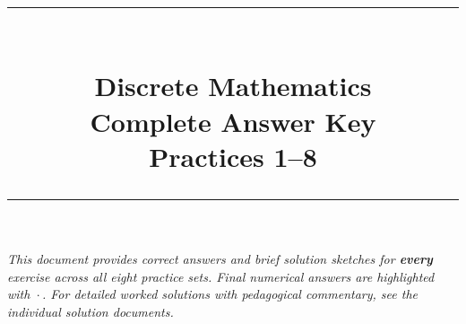 \documentclass[12pt, a4paper]{article}
\title{%
  \vspace{-1.5cm}
  {\color{secBlue}\rule{\textwidth}{2pt}}\\[12pt]
  \textbf{\color{secBlue}Discrete Mathematics}\\[4pt]
  \Large Complete Answer Key\\[4pt]
  \large Practices 1--8\\[6pt]
  {\color{secBlue}\rule{\textwidth}{2pt}}
}
\author{}
\date{}
\begin{document}
\maketitle
\thispagestyle{fancy}

\vspace{-0.5cm}
\begin{tcolorbox}[
  colback=answerBg, colframe=answerFrame,
  boxrule=0.8pt, arc=3pt,
  left=8pt, right=8pt, top=6pt, bottom=6pt
]
\textit{This document provides correct answers and brief solution sketches for
\textbf{every} exercise across all eight practice sets. Final numerical answers are
highlighted with $\boxed{\cdot}$. For detailed worked solutions with pedagogical
commentary, see the individual solution documents.}
\end{tcolorbox}

\bigskip
\tableofcontents

\newpage


\newpage


\newpage


\newpage


\newpage


\newpage


\newpage

\end{document}
